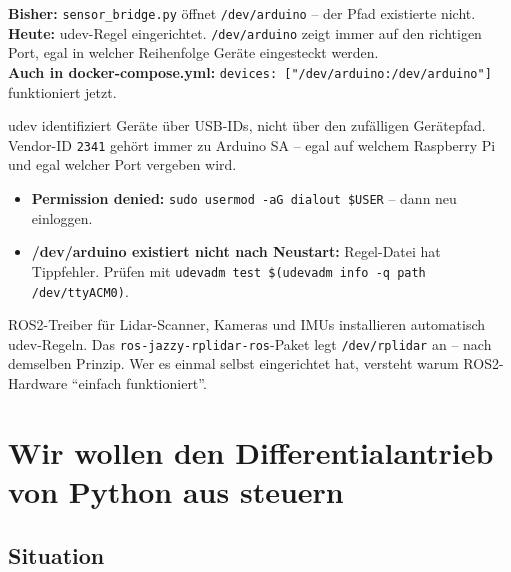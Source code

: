 \begin{projektBox}
\textbf{Bisher:} \texttt{sensor\_bridge.py} öffnet
\texttt{/dev/arduino} -- der Pfad existierte nicht.\\
\textbf{Heute:} udev-Regel eingerichtet.
\texttt{/dev/arduino} zeigt immer auf den richtigen Port,
egal in welcher Reihenfolge Geräte eingesteckt werden.\\
\textbf{Auch in docker-compose.yml:}
\texttt{devices: ["/dev/arduino:/dev/arduino"]} funktioniert jetzt.
\end{projektBox}

\begin{merksatzBox}
udev identifiziert Geräte über USB-IDs, nicht über den
zufälligen Gerätepfad. Vendor-ID \texttt{2341} gehört
immer zu Arduino SA -- egal auf welchem Raspberry Pi
und egal welcher Port vergeben wird.
\end{merksatzBox}

\begin{fehlerBox}
\begin{itemize}
  \item \textbf{Permission denied:}
        \texttt{sudo usermod -aG dialout \$USER} -- dann neu einloggen.
  \item \textbf{/dev/arduino existiert nicht nach Neustart:}
        Regel-Datei hat Tippfehler. Prüfen mit
        \texttt{udevadm test \$(udevadm info -q path /dev/ttyACM0)}.
\end{itemize}
\end{fehlerBox}

\begin{robotikBox}
ROS2-Treiber für Lidar-Scanner, Kameras und IMUs installieren
automatisch udev-Regeln. Das \texttt{ros-jazzy-rplidar-ros}-Paket
legt \texttt{/dev/rplidar} an -- nach demselben Prinzip.
Wer es einmal selbst eingerichtet hat, versteht warum
ROS2-Hardware \enquote{einfach funktioniert}.
\end{robotikBox}

\chapter{Wir wollen den Differentialantrieb von Python aus steuern}

\kapitelstruktur

\section{Situation}

